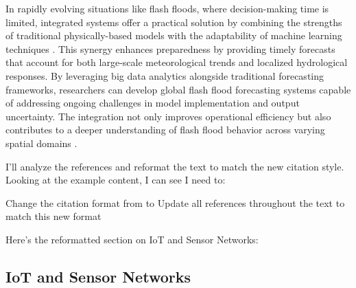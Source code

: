 In rapidly evolving situations like flash floods, where decision-making time is limited, integrated systems offer a practical solution by combining the strengths of traditional physically-based models with the adaptability of machine learning techniques \citep{Borga2019}. This synergy enhances preparedness by providing timely forecasts that account for both large-scale meteorological trends and localized hydrological responses.
By leveraging big data analytics alongside traditional forecasting frameworks, researchers can develop global flash flood forecasting systems capable of addressing ongoing challenges in model implementation and output uncertainty. The integration not only improves operational efficiency but also contributes to a deeper understanding of flash flood behavior across varying spatial domains \citep{Yang2022}\citep{Borga2019}.

I'll analyze the references and reformat the text to match the new citation style. Looking at the example content, I can see I need to:

Change the citation format from \parencite{numeric-code} to \citep{Author+Year}
Update all references throughout the text to match this new format

Here's the reformatted section on IoT and Sensor Networks:

\subsection{IoT and Sensor Networks}
